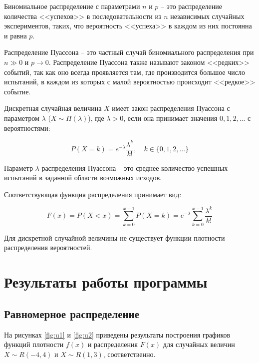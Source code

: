 \documentclass[14pt, a4paper]{extarticle}
\begin{document}
Биномиальное распределение с параметрами $n$ и $p$ -- это распределение количества <<успехов>> в последовательности из $n$ независимых случайных экспериментов, таких, что вероятность <<успеха>> в каждом из них постоянна и равна $p$.

Распределение Пуассона -- это частный случай биномиального распределения при $n \gg 0$ и $p \to 0$. Распределение Пуассона также называют законом <<редких>> событий, так как оно всегда проявляется там, где производится большое число испытаний, в каждом из которых с малой вероятностью происходит <<редкое>> событие.


Дискретная случайная величина $X$ имеет закон распределения Пуассона с параметром $\lambda$ ($X \sim \Pi(\lambda)$), где $\lambda > 0$, если она принимает значения $0, 1, 2,...$ с вероятностями:

\begin{equation}
	P(X = k)= e^{-\lambda}\frac{\lambda^{k}}{k!}, \quad k \in \{0, 1, 2, ...\}
\end{equation}


Параметр $\lambda$ распределения Пуассона -- это среднее количество успешных испытаний в заданной области возможных исходов. 


Соответствующая функция распределения принимает вид:

\begin{equation}
F(x) = P(X < x) = \sum_{k=0}^{x-1}P(X = k) = e^{-\lambda}\sum_{k=0}^{x-1}\frac{\lambda^{k}}{k!} 
\end{equation}

Для дискретной случайной величины не существует функции плотности распределения вероятностей. 

\section{Результаты работы программы}


\subsection{Равномерное распределение}

На рисунках \ref{fig:u1} и \ref{fig:u2} приведены результаты построения графиков функций плотности $f(x)$ и распределения $F(x)$ для случайных величин $X \sim R(-4, 4)$ и $X \sim R(1, 3)$, соответственно.
\end{document}
